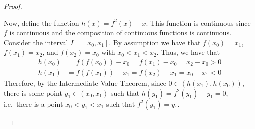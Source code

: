 \begin{proof}
\begin{enumerate}
      Now, define the function $h(x) = f^2(x) - x$. This function is continuous since
      $f$ is continuous and the composition of continuous functions is continuous.
      Consider the interval $I = [x_0, x_1]$. By assumption we have
      that $f(x_0) = x_1$, $f(x_1) = x_2$, and $f(x_2) = x_0$ with $x_0 < x_1 < x_2$. Thus, we have that
      \begin{align*}
        h(x_0) &= f(f(x_0)) - x_0 = f(x_1) - x_0 = x_2 - x_0 > 0\\
        h(x_1) &= f(f(x_1)) - x_1 = f(x_2) - x_1 = x_0 - x_1 < 0
      \end{align*}
      Therefore, by the Intermediate Value Theorem, since $0 \in (h(x_1), h(x_0))$,
      there is some point $y_1\in(x_0,x_1)$ such that $h(y_1) = f^2(y_1) - y_1 = 0$, i.e.\
      there is a point $x_0 < y_1 < x_1$ such that $f^2(y_1) = y_1$.
  \end{enumerate}
\end{proof}
\newpage
